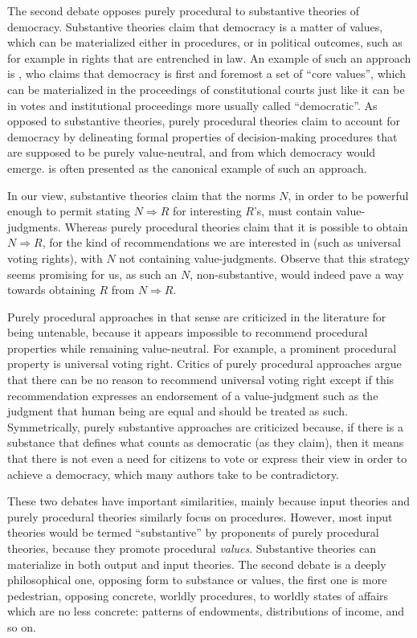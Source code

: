\documentclass[preprint, french, english, 11pt, authoryear]{elsarticle}%
\newcommand{\commentOCf}[1]{\textcolor{red}{\selectlanguage{french}{OC : #1}}}
\begin{document}
The second debate opposes purely procedural to substantive theories of democracy. Substantive theories claim that democracy is a matter of values, which can be materialized either in procedures, or in political outcomes, such as for example in rights that are entrenched in law. An example of such an approach is \cite{brettschneider_value_2006}, who claims that democracy is first and foremost a set of ``core values'', which can be materialized in the proceedings of constitutional courts just like it can be in votes and institutional proceedings more usually called ``democratic''. As opposed to substantive theories, purely procedural theories claim to account for democracy by delineating formal properties of decision-making procedures that are supposed to be purely value-neutral, and from which democracy would emerge. \cite{habermas_faktizitat_1992} is often presented as the canonical example of such an approach. 

In our view, substantive theories claim that the norms $N$, in order to be powerful enough to permit stating $N ⇒ R$ for interesting $R$’s, must contain value-judgments. Whereas purely procedural theories claim that it is possible to obtain $N ⇒ R$, for the kind of recommendations we are interested in (such as universal voting rights), with $N$ not containing value-judgments. Observe that this strategy seems promising for us, as such an $N$, non-substantive, would indeed pave a way towards obtaining $R$ from $N ⇒ R$.

Purely procedural approaches in that sense are criticized in the literature for being untenable, because it appears impossible to recommend procedural properties while remaining value-neutral. For example, a prominent procedural property is universal voting right. Critics of purely procedural approaches argue that there can be no reason to recommend universal voting right except if this recommendation expresses an endorsement of a value-judgment such as the judgment that human being are equal and should be treated as such. Symmetrically, purely substantive approaches are criticized because, if there is a substance that defines what counts as democratic (as they claim), then it means that there is not even a need for citizens to vote or express their view in order to achieve a democracy, which many authors take to be contradictory.
\commentOCf{J’enlèverais ce §.}

These two debates have important similarities, mainly because input theories and purely procedural theories similarly focus on procedures. However, most input theories would be termed ``substantive'' by proponents of purely procedural theories, because they promote procedural \emph{values}. Substantive theories can materialize in both output and input theories. The second debate is a deeply philosophical one, opposing form to substance or values, the first one is more pedestrian, opposing concrete, worldly procedures, to worldly states of affairs which are no less concrete: patterns of endowments, distributions of income, and so on.
\end{document}
